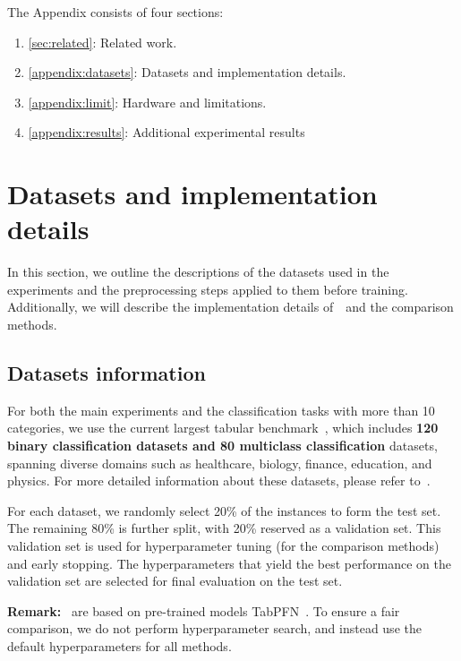
The Appendix consists of four sections:
\begin{enumerate}
\item {\autoref{sec:related}}: Related work.
    \item {\autoref{appendix:datasets}}: Datasets and implementation details.
    \item{\autoref{appendix:limit}}: Hardware and limitations.
    \item{\autoref{appendix:results}}: Additional experimental results
\end{enumerate}


 
\section{Datasets and implementation details}
\label{appendix:datasets}
In this section, we outline the descriptions of the datasets used in the experiments and the preprocessing steps applied to them before training. Additionally, we will describe the implementation details of~\name~and the comparison methods.

\subsection{Datasets information}
For both the main experiments and the classification tasks with more than 10 categories, we use the current largest tabular benchmark~\cite{YeACloser}, which includes \textbf{120 binary classification datasets and 80 multiclass classification} datasets, spanning diverse domains such as healthcare, biology, finance, education, and physics. For more detailed information about these datasets, please refer to~\citet{YeACloser}.

For each dataset, we randomly select 20\% of the instances to form the test set. The remaining 80\% is further split, with 20\% reserved as a validation set. This validation set is used for hyperparameter tuning (for the comparison methods) and early stopping. The hyperparameters that yield the best performance on the validation set are selected for final evaluation on the test set.

\textbf{Remark:} \name~are based on pre-trained models TabPFN~\cite{Hollmann2022TabPFN}. To ensure a fair comparison, we do not perform hyperparameter search, and instead use the default hyperparameters for all methods.

